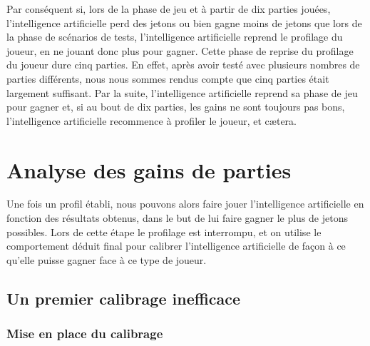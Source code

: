 \documentclass{report}
\begin{document}
Par conséquent si, lors de la phase de jeu et à partir de dix parties jouées, l'intelligence artificielle perd des jetons ou bien gagne moins de jetons que lors de la phase de scénarios de tests, l'intelligence artificielle reprend le profilage du joueur, en ne jouant donc plus pour gagner. Cette phase de reprise du profilage du joueur dure cinq parties. En effet, après avoir testé avec plusieurs nombres de parties différents, nous nous sommes rendus compte que cinq parties était largement suffisant. Par la suite, l'intelligence artificielle reprend sa phase de jeu pour gagner et, si au bout de dix parties, les gains ne sont toujours pas bons, l'intelligence artificielle recommence à profiler le joueur, et cætera.\\

\chapter{Analyse des gains de parties}

\hspace{0.5cm}Une fois un profil établi, nous pouvons alors faire jouer l'intelligence artificielle en fonction des résultats obtenus, dans le but de lui faire gagner le plus de jetons possibles. Lors de cette étape le profilage est interrompu, et on utilise le comportement déduit final pour calibrer l'intelligence artificielle de façon à ce qu'elle puisse gagner face à ce type de joueur.\par

\section{Un premier calibrage inefficace}

\subsection{Mise en place du calibrage}
\end{document}

